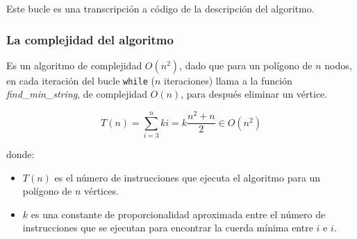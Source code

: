 \documentclass[a4paper, 11pt]{article}
\begin{document}
Este bucle es una transcripción a código de la descripción del algoritmo.

\subsubsection{La complejidad del algoritmo}
Es un algoritmo de complejidad $O(n^2)$, dado que para un polígono de $n$ nodos, en cada iteración del bucle \texttt{while} ($n$ iteraciones) llama a la función \textit{find\_min\_string}, de complejidad $O(n)$, para después eliminar un vértice.

\[
T(n) = \sum_{i=3}^n ki = k\frac{n^2+n}{2} \in O(n^2)
\]

donde:
\begin{itemize}
\item $T(n)$ es el número de instrucciones que ejecuta el algoritmo para un polígono de $n$ vértices.
\item $k$ es una constante de proporcionalidad aproximada entre el número de instrucciones que se ejecutan para encontrar la cuerda mínima entre $i$ e $i$. 
	
\end{itemize}
\end{document}
